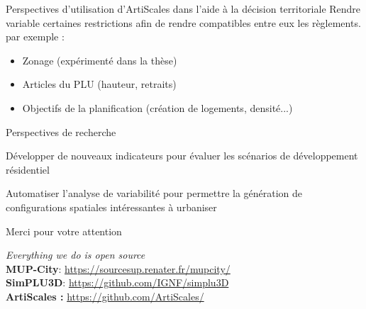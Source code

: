 \documentclass[xcolor=table]{beamer}
\begin{document}
\begin{frame}{Perspectives d'utilisation d'ArtiScales dans l'aide à la décision territoriale}
	Rendre variable certaines restrictions afin de rendre compatibles entre eux les règlements.
	\\
	par exemple : 
	\begin{itemize}
		\item Zonage (expérimenté dans la thèse)
		\item Articles du PLU (hauteur, retraits)
		\item Objectifs de la planification (création de logements, densité...)
	\end{itemize}
\end{frame}

\begin{frame}{Perspectives de recherche}
	\begin{block}{}
	Développer de nouveaux indicateurs pour évaluer les scénarios de développement résidentiel
	\end{block}
	\begin{block}{}
	Automatiser l'analyse de variabilité pour permettre la génération de configurations spatiales intéressantes à urbaniser
	\end{block}
\end{frame}



\begin{frame}[standout]
	\centering
	\begin{block}{}	
		\centering	
		Merci pour votre attention
	\end{block}
	\begin{block}{}
		\centering
		\textit{Everything we do is open source}\\
		\large
		\textbf{MUP-City}: \url{https://sourcesup.renater.fr/mupcity/} \\
		\textbf{SimPLU3D}: \url{https://github.com/IGNF/simplu3D}\\
		\textbf{ArtiScales :} \url{https://github.com/ArtiScales/}
	\end{block}
\end{frame}
\end{document}
